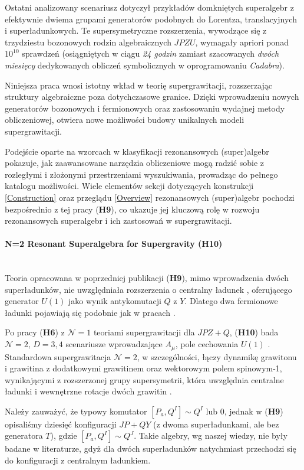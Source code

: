 \documentclass[12pt,a4paper]{article}
\newcommand{\myparagraph}[1]{\paragraph{#1}\mbox{}\\}
\begin{document}
Ostatni analizowany scenariusz dotyczył przykładów domkniętych superalgebr z efektywnie dwiema grupami generatorów podobnych do Lorentza, translacyjnych i superładunkowych. Te supersymetryczne rozszerzenia, wywodzące się z trzydziestu bozonowych rodzin algebraicznych $JPZU$, wymagały apriori ponad $10^{10}$ sprawdzeń (osiągniętych w ciągu \textit{24 godzin} zamiast szacowanych \textit{dwóch miesięcy} dedykowanych obliczeń symbolicznych w oprogramowaniu \textit{Cadabra}). 

Niniejsza praca wnosi istotny wkład w teorię supergrawitacji, rozszerzając struktury algebraiczne poza dotychczasowe granice. Dzięki wprowadzeniu nowych generatorów bozonowych i fermionowych oraz zastosowaniu wydajnej metody obliczeniowej, otwiera nowe możliwości budowy unikalnych modeli supergrawitacji.

Podejście oparte na wzorcach w klasyfikacji rezonansowych (super)algebr pokazuje, jak zaawansowane narzędzia obliczeniowe mogą radzić sobie z rozległymi i złożonymi przestrzeniami wyszukiwania, prowadząc do pełnego katalogu możliwości. Wiele elementów sekcji dotyczących konstrukcji \eqref{Construction} oraz przeglądu \eqref{Overview} rezonansowych (super)algebr pochodzi bezpośrednio z tej pracy (\textbf{H9}), co ukazuje jej kluczową rolę w rozwoju rezonansowych superalgebr i ich zastosowań w supergrawitacji.

\myparagraph{N=2 Resonant Superalgebra for Supergravity (H10)} 

Teoria opracowana w poprzedniej publikacji (\textbf{H9}), mimo wprowadzenia dwóch superładunków, nie uwzględniała rozszerzenia o centralny ładunek \cite{Haag:1974qh}, oferującego generator $U(1)$ jako wynik antykomutacji $Q$ z $Y$. Dlatego dwa fermionowe ładunki pojawiają się podobnie jak w pracach \cite{Durka:2012wd, Soroka:2006aj, Lukierski:2010dy, Durka:2011gm}. 

Po pracy (\textbf{H6}) z $\mathcal{N}=1$ teoriami supergrawitacji dla $JPZ+Q$, (\textbf{H10}) bada $\mathcal{N} = 2$, $D = 3, 4$ scenariusze wprowadzające $A_{\mu}$, pole cechowania $U(1)$ \cite{Gocanin:2019ota}. Standardowa supergrawitacja $\mathcal{N}=2$, w szczególności, łączy dynamikę grawitonu i grawitina z dodatkowymi grawitinem oraz wektorowym polem spinowym-1, wynikającymi z rozszerzonej grupy supersymetrii, która uwzględnia centralne ładunki i wewnętrzne rotacje dwóch grawitin \cite{VanNieuwenhuizen:1981ae}.

Należy zauważyć, że typowy komutator $[P_a, Q^I] \sim Q^I$ lub $0$, jednak w (\textbf{H9}) opisaliśmy dziesięć konfiguracji $JP+QY$ (z dwoma superładunkami, ale bez generatora $T$), gdzie $[P_a, Q^I] \sim Q^{J}$. Takie algebry, wg naszej wiedzy, nie były badane w literaturze, gdyż dla dwóch superładunków natychmiast przechodzi się do konfiguracji z centralnym ładunkiem.
\end{document}
